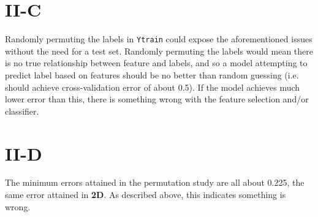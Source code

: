 \documentclass{article}
\begin{document}
\section*{II-C}

Randomly permuting the labels in \texttt{Ytrain} could expose the aforementioned
issues without the need for a test set. Randomly permuting the labels would mean
there is no true relationship between feature and labels, and so a model attempting
to predict label based on features should be no better than random guessing
(i.e. should achieve cross-validation error of about 0.5). 
If the model achieves much lower error than this,
there is something wrong with the feature selection and/or classifier.

\section*{II-D}

The minimum errors attained in the permutation study are all about 0.225, the same
error attained in \textbf{2D}. As described above, this indicates something is
wrong.
\end{document}
